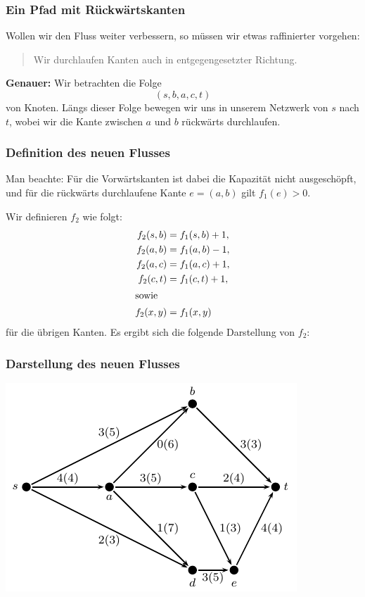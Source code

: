 \documentclass[smaller]{beamer}
\begin{document}
\begin{frame}
 \frametitle{Ein Pfad mit {\glqq}Rückwärtskanten{\grqq}}
 Wollen wir den Fluss weiter verbessern, so müssen wir etwas raffinierter vorgehen: 
\begin{quote}
{Wir durchlaufen Kanten \alert{auch in entgegengesetzter Richtung}.}
\end{quote}

\textbf{Genauer:} Wir betrachten die Folge
\begin{equation}
\label{eq:9:4}
(s,b,a,c,t)
\end{equation}
von Knoten. Längs dieser Folge bewegen wir uns in  unserem Netzwerk von $s$ nach $t$, wobei wir die Kante zwischen $a$ und $b$ rückwärts durchlaufen.
\end{frame}

\begin{frame}
 \frametitle{Definition des neuen Flusses}
 Man beachte: Für die {\glqq}Vorwärtskanten{\grqq} ist dabei die Kapazität nicht ausgeschöpft, und für die rückwärts durchlaufene Kante $e=(a,b)$ gilt $f_1(e) > 0$. \\ \vspace*{0.2cm}
 
 Wir definieren $f_2$ wie folgt:
\begin{align*}
f_2(s,b) &= f_1(s,b)+1, \\
f_2(a,b) &= f_1(a,b)-1, \\
f_2(a,c) &= f_1(a,c)+1, \\
f_2(c,t) &= f_1(c,t)+1, \\
\intertext{sowie}
f_2(x,y) &= f_1(x,y)
\end{align*}
für die übrigen Kanten. Es ergibt sich die folgende Darstellung von $f_2$:
\end{frame}

\begin{frame}
 \frametitle{Darstellung des neuen Flusses}
 \begin{center}
  \includegraphics{fig15.pdf}
 \end{center}

\end{frame}
\end{document}
